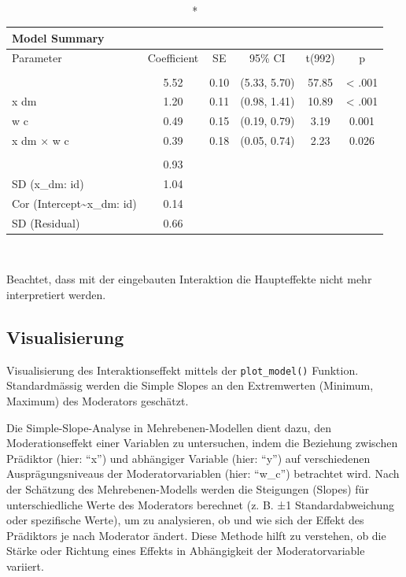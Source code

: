 \documentclass[
  letterpaper,
  DIV=11,
  numbers=noendperiod]{scrreprt}
\begin{document}
\begingroup
\fontsize{12.0pt}{14.4pt}\selectfont
\setlength{\LTpost}{0mm}
\begin{longtable*}{lccccc}
\caption*{
{\large Model Summary}
} \\ 
\toprule
Parameter & Coefficient & SE & 95\% CI & t(992) & p \\ 
\midrule\addlinespace[2.5pt]
 \\[2.5pt] 
\midrule{} & 5.52 & 0.10 & (5.33, 5.70) & 57.85 & < .001 \\ 
{x dm} & 1.20 & 0.11 & (0.98, 1.41) & 10.89 & < .001 \\ 
{w c} & 0.49 & 0.15 & (0.19, 0.79) & 3.19 & 0.001  \\ 
{x dm × w c} & 0.39 & 0.18 & (0.05, 0.74) & 2.23 & 0.026  \\ 
\midrule\addlinespace[2.5pt]
 \\[2.5pt] 
\midrule{} & 0.93 &  &  &  &  \\ 
{SD (x\_dm: id)} & 1.04 &  &  &  &  \\ 
{Cor (Intercept\textasciitilde{}x\_dm: id)} & 0.14 &  &  &  &  \\ 
{SD (Residual)} & 0.66 &  &  &  &  \\ 
\bottomrule
\end{longtable*}
\begin{minipage}{\linewidth}
\\
\end{minipage}
\endgroup

Beachtet, dass mit der eingebauten Interaktion die Haupteffekte nicht
mehr interpretiert werden.

\subsection{Visualisierung}\label{visualisierung-3}

Visualisierung des Interaktionseffekt mittels der \texttt{plot\_model()}
Funktion. Standardmässig werden die Simple Slopes an den Extremwerten
(Minimum, Maximum) des Moderators geschätzt.

Die Simple-Slope-Analyse in Mehrebenen-Modellen dient dazu, den
Moderationseffekt einer Variablen zu untersuchen, indem die Beziehung
zwischen Prädiktor (hier: ``x'') und abhängiger Variable (hier: ``y'')
auf verschiedenen Ausprägungsniveaus der Moderatorvariablen (hier:
``w\_c'') betrachtet wird. Nach der Schätzung des Mehrebenen-Modells
werden die Steigungen (Slopes) für unterschiedliche Werte des Moderators
berechnet (z. B. ±1 Standardabweichung oder spezifische Werte), um zu
analysieren, ob und wie sich der Effekt des Prädiktors je nach Moderator
ändert. Diese Methode hilft zu verstehen, ob die Stärke oder Richtung
eines Effekts in Abhängigkeit der Moderatorvariable variiert.
\end{document}
